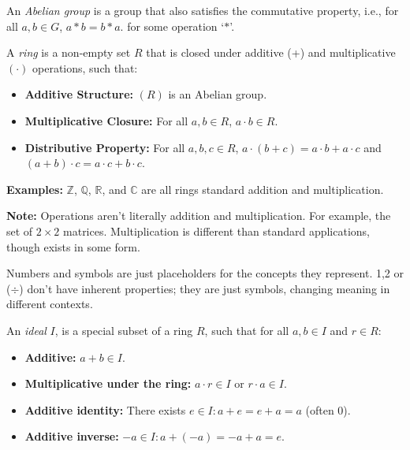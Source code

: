 \begin{Def}

    An \textit{Abelian group} is a group that also satisfies the commutative property, i.e., for all $a,b\in G$, $a*b=b*a$.
    for some operation `$*$'.

\end{Def}

\begin{Def}[Ring]

    \label{def:ring}

    A \textit{ring} is a non-empty set $R$ that is closed under additive (+) and multiplicative $(\cdot)$ operations, such that:
    \begin{itemize}
        \item \textbf{Additive Structure:} $(R)$ is an Abelian group.
        \item \textbf{Multiplicative Closure:} For all $a,b\in R$, $a\cdot b\in R$.
        \item \textbf{Distributive Property:} For all $a,b,c\in R$, $a\cdot(b+c)=a\cdot b+a\cdot c$ and $(a+b)\cdot c=a\cdot c+b\cdot c$.
    \end{itemize}
\end{Def}

\noindent
\textbf{Examples:} $\mathbb{Z}$, $\mathbb{Q}$, $\mathbb{R}$, and $\mathbb{C}$ are all rings standard addition and multiplication.\\

\begin{Note}
    \textbf{Note:} Operations aren't literally addition and multiplication. For example,
    the set of $2\times2$ matrices. Multiplication is different than standard applications, though exists in some form.
\end{Note}
\begin{Tip}
    Numbers and symbols are just placeholders for the concepts they represent.
    1,2 or ($\div$) don't have inherent properties; they are just symbols, changing meaning
    in different contexts.
\end{Tip}

\newpage

\begin{Def}[Ideal]

    \label{def:ideal}

    An \textit{ideal} $I$, is a special subset of a ring $R$, such that for all $a,b\in I$ and $r\in R$:
    \begin{itemize}
        \item \textbf{Additive:} $a+b\in I$.
        \item \textbf{Multiplicative under the ring:} $a\cdot r\in I$ or $r\cdot a\in I$.
        \item \textbf{Additive identity:} There exists $e\in I:a+e=e+a=a$ (often 0).
        \item \textbf{Additive inverse:} $-a\in I:a+(-a)=-a+a=e$.
    \end{itemize}
\end{Def}

